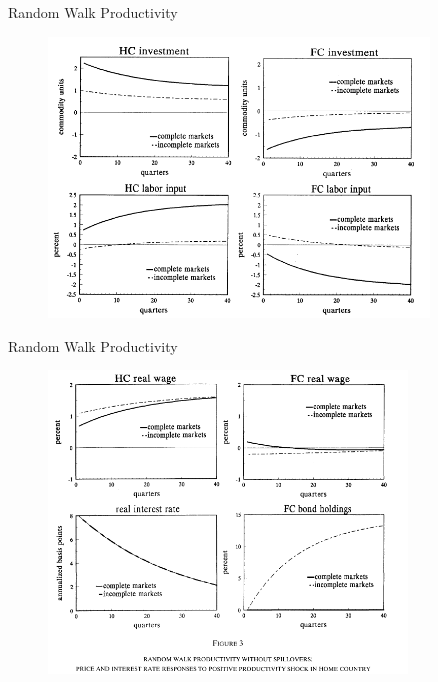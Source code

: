 \documentclass[10pt]{beamer}
\begin{document}
\begin{frame}{Random Walk Productivity}
\begin{figure}[thbp]
  \centering
  \includegraphics[width=0.90\textwidth]{11.png}
\end{figure}
\end{frame}

\begin{frame}{Random Walk Productivity}
\begin{figure}[thbp]
  \centering
  \includegraphics[width=0.85\textwidth]{12.png}
\end{figure}
\end{frame}
\end{document}
